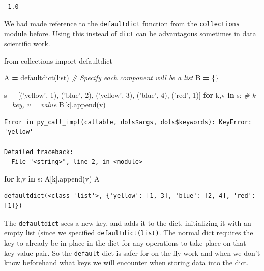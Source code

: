 \documentclass[
  letterpaper,
]{scrbook}
\newenvironment{Shaded}{\begin{snugshade}}{\end{snugshade}}
\newcommand{\BuiltInTok}[1]{#1}
\newcommand{\CommentTok}[1]{\textcolor[rgb]{0.56,0.35,0.01}{\textit{#1}}}
\newcommand{\ControlFlowTok}[1]{\textcolor[rgb]{0.13,0.29,0.53}{\textbf{#1}}}
\newcommand{\DecValTok}[1]{\textcolor[rgb]{0.00,0.00,0.81}{#1}}
\newcommand{\ImportTok}[1]{#1}
\newcommand{\KeywordTok}[1]{\textcolor[rgb]{0.13,0.29,0.53}{\textbf{#1}}}
\newcommand{\NormalTok}[1]{#1}
\newcommand{\OperatorTok}[1]{\textcolor[rgb]{0.81,0.36,0.00}{\textbf{#1}}}
\newcommand{\StringTok}[1]{\textcolor[rgb]{0.31,0.60,0.02}{#1}}
\begin{document}
\begin{verbatim}
-1.0
\end{verbatim}

We had made reference to the \texttt{defaultdict} function from the \texttt{collections} module before. Using this instead of \texttt{dict} can be advantagous sometimes in data scientific work.

\begin{Shaded}
\begin{Highlighting}[]
\ImportTok{from}\NormalTok{ collections }\ImportTok{import}\NormalTok{ defaultdict}

\NormalTok{A }\OperatorTok{=}\NormalTok{ defaultdict(}\BuiltInTok{list}\NormalTok{) }\CommentTok{# Specify each component will be a list}
\NormalTok{B }\OperatorTok{=}\NormalTok{ \{\}}

\NormalTok{s }\OperatorTok{=}\NormalTok{ [(}\StringTok{'yellow'}\NormalTok{, }\DecValTok{1}\NormalTok{), (}\StringTok{'blue'}\NormalTok{, }\DecValTok{2}\NormalTok{), (}\StringTok{'yellow'}\NormalTok{, }\DecValTok{3}\NormalTok{), (}\StringTok{'blue'}\NormalTok{, }\DecValTok{4}\NormalTok{), (}\StringTok{'red'}\NormalTok{, }\DecValTok{1}\NormalTok{)]}
\ControlFlowTok{for}\NormalTok{ k,v }\KeywordTok{in}\NormalTok{ s: }\CommentTok{# k = key, v = value}
\NormalTok{    B[k].append(v)}
\end{Highlighting}
\end{Shaded}

\begin{verbatim}
Error in py_call_impl(callable, dots$args, dots$keywords): KeyError: 'yellow'

Detailed traceback: 
  File "<string>", line 2, in <module>
\end{verbatim}

\begin{Shaded}
\begin{Highlighting}[]
\ControlFlowTok{for}\NormalTok{ k,v }\KeywordTok{in}\NormalTok{ s:}
\NormalTok{    A[k].append(v)}
\NormalTok{A}
\end{Highlighting}
\end{Shaded}

\begin{verbatim}
defaultdict(<class 'list'>, {'yellow': [1, 3], 'blue': [2, 4], 'red': [1]})
\end{verbatim}

The \texttt{defaultdict} sees a new key, and adds it to the dict, initializing it with an empty list (since we specified \texttt{defaultdict(list)}. The normal dict requires the key to already be in place in the dict for any operations to take place on that key-value pair. So the \texttt{default} dict is safer for on-the-fly work and when we don't know beforehand what keys we will encounter when storing data into the dict.
\end{document}
